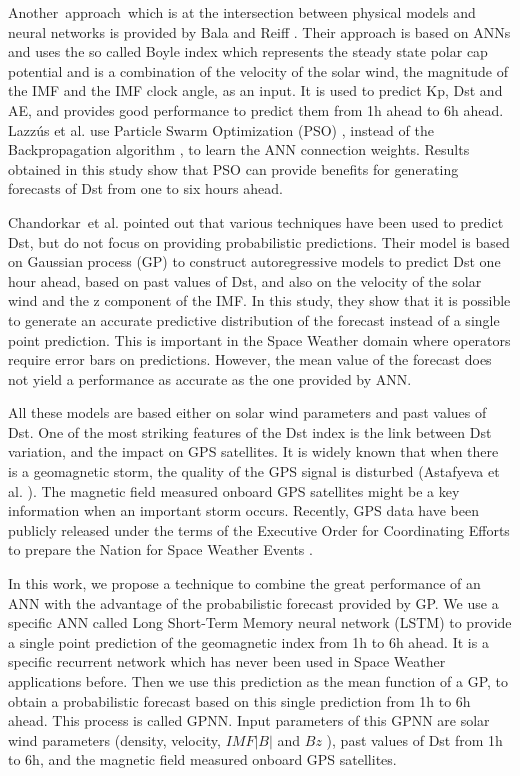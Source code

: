 Another\ approach\ which is at the intersection between physical models and neural networks is provided by 
Bala and Reiff \cite{Bala2012}. Their approach is based on ANNs and uses the so called Boyle index which represents 
the steady state polar cap potential and is a combination of the velocity of the solar wind, the magnitude of 
the IMF and the IMF clock angle, as an input. It is used to predict Kp, Dst and AE, and provides good performance 
to predict them from 1h ahead to 6h ahead. Lazz\'us et al. \cite{Lazzus} use 
Particle Swarm Optimization (PSO) \cite{eberhart1995new}, instead of the Backpropagation algorithm 
\cite{rummelhart1986parallel}, to learn the ANN connection weights. Results obtained in this study show 
that PSO can provide benefits for generating forecasts of Dst from one to six hours ahead.

Chandorkar\ et al. \cite{ChandorkarDst} pointed out that various techniques have been used to predict Dst, but do not 
focus on  providing probabilistic predictions. Their model is based on Gaussian process (GP) to construct 
autoregressive models to predict Dst one hour ahead, based on past values of Dst, and also on the velocity of 
the solar wind and the z component of the IMF. In this study, they show that it is possible to generate an 
accurate predictive distribution of the forecast instead of a single point prediction. This is important in the 
Space Weather domain where operators require error bars on predictions. However, the mean value of the forecast 
does not yield a performance as accurate as the one provided by ANN. 

All these models are based either on solar wind parameters and past values of Dst. One of the most striking features 
of the Dst index is the link between Dst variation, and the impact on GPS satellites. It is widely known that when 
there is a geomagnetic storm, the quality of the GPS signal is disturbed 
(Astafyeva et al. \cite{astafyeva2014geomagnetic}). The magnetic field measured onboard GPS satellites might be a 
key information when an important storm occurs. Recently, GPS data have been publicly released under the terms 
of the Executive Order for Coordinating Efforts to prepare the Nation for 
Space Weather Events \cite{morley2017energetic}. 

In this work, we propose a technique to combine the great performance of an ANN with the advantage of the 
probabilistic forecast provided by GP. We use a specific ANN called Long Short-Term Memory neural network (LSTM) 
\cite{hochreiter1997long} to provide a single point prediction of the geomagnetic index from 1h to 6h ahead. 
It is a specific recurrent network which has never been used in Space Weather applications before. Then we use this 
prediction as the mean function of a GP, to obtain a probabilistic forecast based on this single prediction from 
1h to 6h ahead. This process is called GPNN. Input parameters of this GPNN are solar wind parameters 
(density, velocity,  \( IMF  \vert B \vert  \)  and \(  Bz \) ), past values of Dst from 1h to 6h, and the 
magnetic field measured onboard GPS satellites. 

